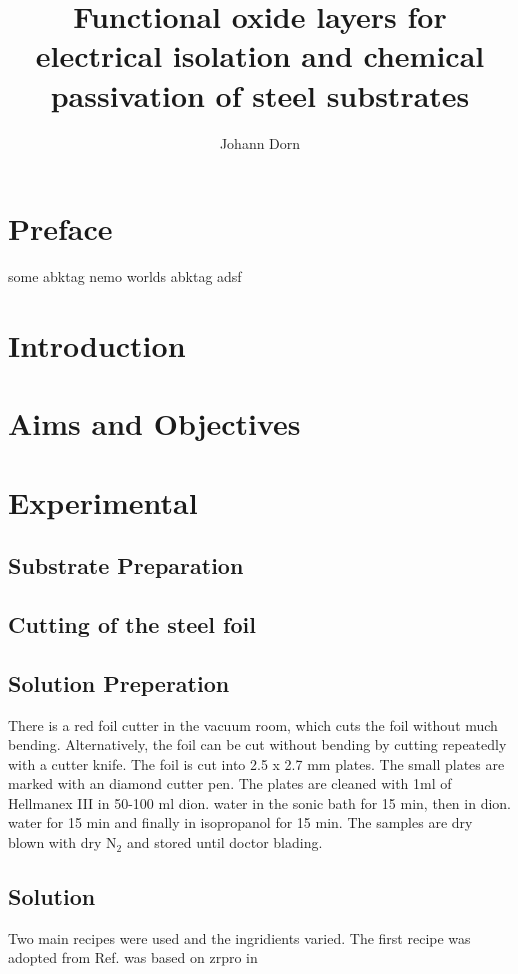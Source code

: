 \documentclass[a4paper]{article}
\title{Functional oxide layers for electrical isolation and chemical passivation of steel substrates}
\author{Johann Dorn}
\begin{document}
\maketitle
\iffalse
my notes
\fi

\printglossaries
\section{Preface}
some 
\Ac{abktag}
\gls{nemo}
worlds
\Ac{abktag}
adsf

\section{Introduction}
\section{Aims and Objectives}
\section{Experimental}
\subsection{Substrate Preparation}
\subsection{Cutting of the steel foil}
\subsection{Solution Preperation}
\label{sec:cut}
There is a red foil cutter in the vacuum room, which cuts the foil without much bending.
Alternatively, the foil can be cut without bending by cutting repeatedly with a cutter knife.
The foil is cut into 2.5 x 2.7 mm plates.
The small plates are marked with an diamond cutter pen.
The plates are cleaned with 1ml of Hellmanex III in 50-100 ml dion. water in the sonic bath for 15 min, then in dion. water for 15 min and finally in isopropanol for 15 min. 
The samples are dry blown with dry N$_2$ and stored until doctor blading.

\subsection{Solution}
Two main recipes were used and the ingridients varied. 
The first recipe was adopted from Ref. \cite{Anwar2017} was based on \gls{zrpro} in 
\end{document}
